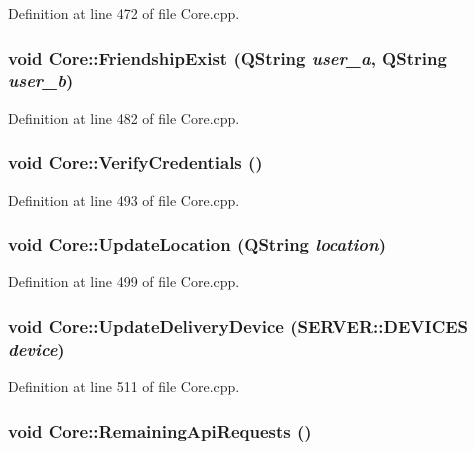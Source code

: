 Definition at line 472 of file Core.cpp.\hypertarget{classCore_0430da6765198a4f763ea7528f8e1e86}{
\subsubsection{\setlength{\rightskip}{0pt plus 5cm}void Core::FriendshipExist (QString {\em user\_\-a}, \/  QString {\em user\_\-b})}}
\label{classCore_0430da6765198a4f763ea7528f8e1e86}




Definition at line 482 of file Core.cpp.\hypertarget{classCore_e7b7355b923afe51411e3c949679904d}{
\subsubsection{\setlength{\rightskip}{0pt plus 5cm}void Core::VerifyCredentials ()}}
\label{classCore_e7b7355b923afe51411e3c949679904d}




Definition at line 493 of file Core.cpp.\hypertarget{classCore_62635d6cffb1fbef9f5c650518f83c67}{
\subsubsection{\setlength{\rightskip}{0pt plus 5cm}void Core::UpdateLocation (QString {\em location})}}
\label{classCore_62635d6cffb1fbef9f5c650518f83c67}




Definition at line 499 of file Core.cpp.\hypertarget{classCore_291a15a3ec5ebadc314c991f74cde776}{
\subsubsection{\setlength{\rightskip}{0pt plus 5cm}void Core::UpdateDeliveryDevice ({\bf SERVER::DEVICES} {\em device})}}
\label{classCore_291a15a3ec5ebadc314c991f74cde776}




Definition at line 511 of file Core.cpp.\hypertarget{classCore_0cf4c10e33b1158e651977210312ea13}{
\subsubsection{\setlength{\rightskip}{0pt plus 5cm}void Core::RemainingApiRequests ()}}
\label{classCore_0cf4c10e33b1158e651977210312ea13}




